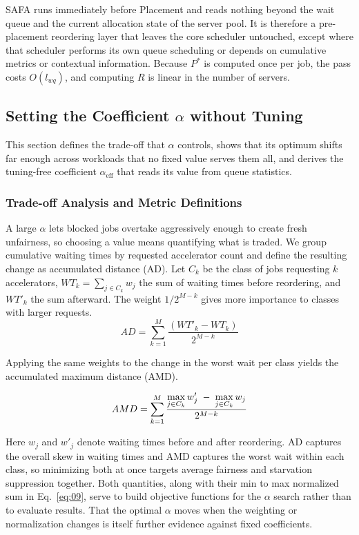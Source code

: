 \documentclass{ieeetj}
\begin{document}
SAFA runs immediately before Placement and reads nothing beyond the wait queue and the current allocation state of the server pool. It is therefore a pre-placement reordering layer that leaves the core scheduler untouched, except where that scheduler performs its own queue scheduling or depends on cumulative metrics or contextual information. Because $P^*$ is computed once per job, the pass costs $O(l_{wq})$, and computing $R$ is linear in the number of servers.

\subsection{Setting the Coefficient $\alpha$ without Tuning}\label{sec:coeff}
This section defines the trade-off that $\alpha$ controls, shows that its optimum shifts far enough across workloads that no fixed value serves them all, and derives the tuning-free coefficient $\alpha_{\text{eff}}$ that reads its value from queue statistics.

\subsubsection{Trade-off Analysis and Metric Definitions}
A large $\alpha$ lets blocked jobs overtake aggressively enough to create fresh unfairness, so choosing a value means quantifying what is traded. We group cumulative waiting times by requested accelerator count and define the resulting change as accumulated distance (AD). Let $C_k$ be the class of jobs requesting $k$ accelerators, $WT_k=\sum_{j\in C_k} w_j$ the sum of waiting times before reordering, and $WT'_k$ the sum afterward. The weight $1/2^{M-k}$ gives more importance to classes with larger requests.
\begin{equation}
AD = \sum_{k=1}^{M} \frac{(WT'_k - WT_k)}{2^{M-k}}
\label{eq:07}
\end{equation}

Applying the same weights to the change in the worst wait per class yields the accumulated maximum distance (AMD).

\begin{equation}
AMD = \sum_{k=1}^{M} \frac{\max\limits_{j\in C_k} w'_j \;-\; \max\limits_{j\in C_k} w_j}{2^{M-k}}
\label{eq:08}
\vspace{2pt}
\end{equation}

Here $w_j$ and $w'_j$ denote waiting times before and after reordering. AD captures the overall skew in waiting times and AMD captures the worst wait within each class, so minimizing both at once targets average fairness and starvation suppression together. Both quantities, along with their min to max normalized sum in Eq.~\eqref{eq:09}, serve to build objective functions for the $\alpha$ search rather than to evaluate results. That the optimal $\alpha$ moves when the weighting or normalization changes is itself further evidence against fixed coefficients.
\end{document}
